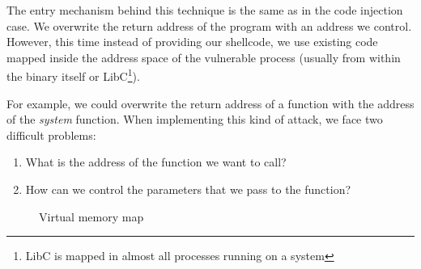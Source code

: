 \documentclass{article}
\begin{document}
The entry mechanism behind this technique is the same as in the code injection case. We overwrite the return address of the program with an address we control. However, this time instead of providing our shellcode, we use existing code mapped inside the address space of the vulnerable process (usually from within the binary itself or LibC\footnote{LibC is mapped in almost all processes running on a system}).

For example, we could overwrite the return address of a function with the address of the \emph{system} function. When implementing this kind of attack, we face two difficult problems:
\begin{enumerate}
  \item What is the address of the function we want to call?
  \item How can we control the parameters that we pass to the function?
\end{enumerate}

\begin{figure}[ht]%
  \centering
  \caption{\label{fig:vmmap} Virtual memory map}%
\end{figure}
\end{document}
